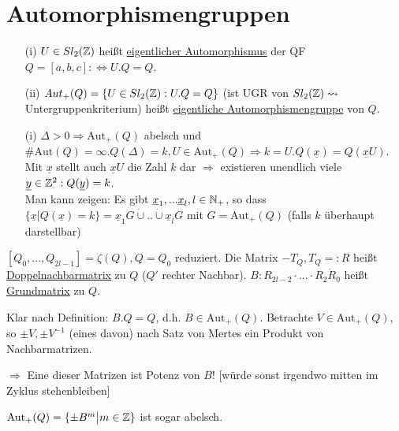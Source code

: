\documentclass[a4paper,DIV15,BCOR12mm]{article}
\begin{document}
\section{Automorphismengruppen}

\begin{definition}
\begin{itemize}
\item[(i)] $U \in Sl_2(\mathbb{Z})$ heißt \underline{eigentlicher Automorphismus} der QF $Q = [a,b,c] :\Leftrightarrow U.Q = Q$.
\item[(ii)] $Aut_+(Q) = \{U \in Sl_2(\mathbb{Z}): U.Q = Q\}$ (ist UGR von $Sl_2(\mathbb{Z}) \leadsto$ Untergruppenkriterium) heißt \underline{eigentliche Automorphismengruppe} von $Q$.
\end{itemize}
\end{definition}

\begin{beweis}
\begin{itemize}
\item[(i)] $\Delta > 0 \Rightarrow \text{Aut}_+(Q)$ abelsch und $\#\text{Aut}(Q) = \infty. Q(\Delta) = k, U \in \text{Aut}_+(Q) \Rightarrow k = U.Q(\underline x) = Q(\underline xU)$. Mit $\underline x$ stellt auch $\underline xU$ die Zahl $k$ dar $\Rightarrow$ existieren unendlich viele $\underline y \in \mathbb{Z}^2: Q(\underline y) = k$.\\
Man kann zeigen: Es gibt $\underline x_1, ... \underline x_l, l \in \mathbb{N}_+$, so dass $\{\underline x \big| Q(\underline x) = k\} = \underline x_1G \dot \cup .. \dot \cup \underline x_lG$ mit $G = \text{Aut}_+(Q)$ (falls $k$ überhaupt darstellbar)
\end{itemize}
\end{beweis}

\begin{definition}
$[Q_0, ..., Q_{2l-1}] = \zeta(Q), Q = Q_0$ reduziert. Die Matrix $-T_Q, T_Q =: R$ heißt \underline{Doppelnachbarmatrix} zu $Q$ ($Q'$ rechter Nachbar). $B: R_{2l-2} \cdot ... \cdot R_2 \dot R_0$ heißt \underline{Grundmatrix} zu $Q$.
\end{definition}

Klar nach Definition: $B.Q = Q$, d.h. $B \in \text{Aut}_+(Q)$. Betrachte $V \in \text{Aut}_+(Q)$, so $\pm V, \pm V^{-1}$ (eines davon) nach Satz von Mertes ein Produkt von Nachbarmatrizen.

$\Rightarrow$ Eine dieser Matrizen ist Potenz von $B$! [würde sonst irgendwo mitten im Zyklus stehenbleiben]

\begin{satz}
$\text{Aut}_+(Q) = \{\pm B^m \big| m \in \mathbb{Z}\}$ ist sogar abelsch.
\end{satz}
\end{document}
